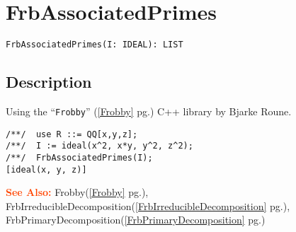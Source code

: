 \documentclass[a4paper]{mybook}
\newenvironment{command}{}{} %
\newcommand\SeeAlso{\par\textcolor{OrangeRed}{\textbf{\large See Also: }}}
\begin{document}
\section{FrbAssociatedPrimes}
\label{FrbAssociatedPrimes}
\begin{command} %


\begin{Verbatim}[label=syntax, rulecolor=\color{MidnightBlue},
frame=single]
FrbAssociatedPrimes(I: IDEAL): LIST
\end{Verbatim}


\subsection*{Description}

Using the ``\verb&Frobby&'' (\ref{Frobby} pg.\pageref{Frobby}) C++ library by Bjarke Roune.
\begin{Verbatim}[label=example, rulecolor=\color{PineGreen}, frame=single]
/**/  use R ::= QQ[x,y,z];
/**/  I := ideal(x^2, x*y, y^2, z^2);
/**/  FrbAssociatedPrimes(I);
[ideal(x, y, z)]
\end{Verbatim}


\SeeAlso %
  Frobby(\ref{Frobby} pg.\pageref{Frobby}), 
    FrbIrreducibleDecomposition(\ref{FrbIrreducibleDecomposition} pg.\pageref{FrbIrreducibleDecomposition}), 
    FrbPrimaryDecomposition(\ref{FrbPrimaryDecomposition} pg.\pageref{FrbPrimaryDecomposition})
\end{command} %
\end{document}
